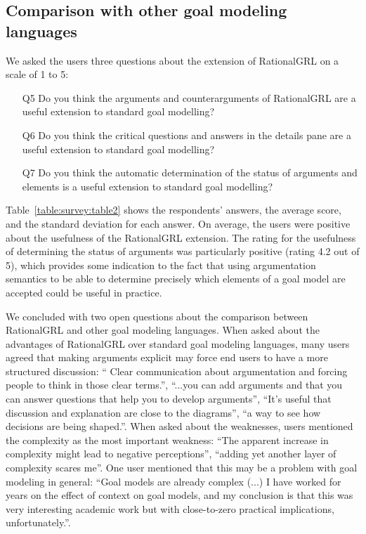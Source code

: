 \subsection{Comparison with other goal modeling languages}

We asked the users three questions about the extension of RationalGRL on a scale of 1 to 5:
\begin{itemize}
\item[Q5] Do you think the arguments and counterarguments of RationalGRL are a useful extension to standard goal modelling?
\item[Q6] Do you think the critical questions and answers in the details pane are a useful extension to standard goal modelling?
\item[Q7] Do you think the automatic determination of the status of arguments and elements is a useful extension to standard goal modelling?
\end{itemize}

Table~\ref{table:survey:table2} shows the respondents' answers, the average score, and the standard deviation for each answer. On average, the users were positive about the usefulness of the RationalGRL extension. The rating for the usefulness of determining the status of arguments was particularly positive (rating 4.2 out of 5), which provides some indication to the fact that using argumentation semantics to be able to determine precisely which elements of a goal model are accepted could be useful in practice.

We concluded with two open questions about the comparison between RationalGRL and other goal modeling languages. When asked about the advantages of RationalGRL over standard goal modeling languages, many users agreed that making arguments explicit may force end users to have a more structured discussion: ``	Clear communication about argumentation and forcing people to think in those clear terms.'', ``...you can add arguments and that you can answer questions that help you to develop arguments'', ``It's useful that discussion and explanation are close to the diagrams'', ``a way to see how decisions are being shaped.''. When asked about the weaknesses, users mentioned the complexity as the most important weakness: ``The apparent increase in complexity might lead to negative perceptions'', ``adding yet another layer of complexity scares me''. One user mentioned that this may be a problem with goal modeling in general: ``Goal models are already complex (...) I have worked for years on the effect of context on goal models, and my conclusion is that this was very interesting academic work but with close-to-zero practical implications, unfortunately.''.

